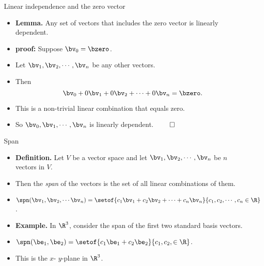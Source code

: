 \documentclass{beamer}
\begin{document}
\begin{frame}{Linear independence and the zero vector}

\begin{itemize}
\item \textbf{Lemma.} Any set of vectors that includes the zero vector is linearly dependent.
\item \textbf{proof:} Suppose $\bv_0=\bzero$.
\item Let $\bv_1,\bv_2,\cdots,\bv_n$ be any
other vectors.
\item Then
$$\bv_0 + 0\bv_1 + 0\bv_2 + \cdots + 0\bv_n = \bzero.$$
\item This is a non-trivial linear combination that equals zero.
\item So $\bv_0,\bv_1,\cdots,\bv_n$ is linearly dependent. $\qed$
\end{itemize}

\end{frame}
\begin{frame}{Span}

\begin{itemize}
\item \textbf{Definition.} Let $V$ be a vector space and let $\bv_1,\bv_2,\cdots,\bv_n$ be $n$ vectors in $V$.
\item Then the \emph{span} of the vectors is the set of all linear combinations of them.
\item $\spn(\bv_1,\bv_2,\cdots\bv_n)=\setof{c_1\bv_1+c_2\bv_2+\cdots+c_n\bv_n}{c_1,c_2,\cdots,c_n\in\R}$.
\item \textbf{Example.} In $\R^3$, consider the span of the first two standard basis vectors.
\item $\spn(\be_1,\be_2) = \setof{c_1\be_1+c_2\be_2}{c_1,c_2,\in\R}$.
\item This is the $x$- $y$-plane in $\R^3$.
\end{itemize}

\end{frame}
\end{document}
